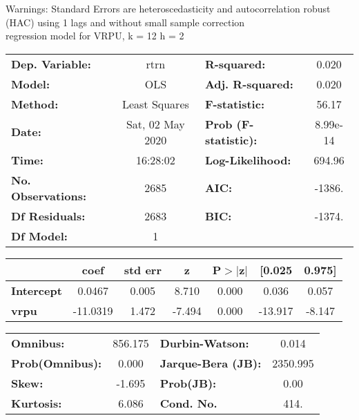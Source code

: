 Warnings: \newline
 [1] Standard Errors are heteroscedasticity and autocorrelation robust (HAC) using 1 lags and without small sample correction\\ 

regression model for VRPU, k = 12 h = 2\begin{center}
\begin{tabular}{lclc}
\toprule
\textbf{Dep. Variable:}    &       rtrn       & \textbf{  R-squared:         } &     0.020   \\
\textbf{Model:}            &       OLS        & \textbf{  Adj. R-squared:    } &     0.020   \\
\textbf{Method:}           &  Least Squares   & \textbf{  F-statistic:       } &     56.17   \\
\textbf{Date:}             & Sat, 02 May 2020 & \textbf{  Prob (F-statistic):} &  8.99e-14   \\
\textbf{Time:}             &     16:28:02     & \textbf{  Log-Likelihood:    } &    694.96   \\
\textbf{No. Observations:} &        2685      & \textbf{  AIC:               } &    -1386.   \\
\textbf{Df Residuals:}     &        2683      & \textbf{  BIC:               } &    -1374.   \\
\textbf{Df Model:}         &           1      & \textbf{                     } &             \\
\bottomrule
\end{tabular}
\begin{tabular}{lcccccc}
                   & \textbf{coef} & \textbf{std err} & \textbf{z} & \textbf{P$> |$z$|$} & \textbf{[0.025} & \textbf{0.975]}  \\
\midrule
\textbf{Intercept} &       0.0467  &        0.005     &     8.710  &         0.000        &        0.036    &        0.057     \\
\textbf{vrpu}      &     -11.0319  &        1.472     &    -7.494  &         0.000        &      -13.917    &       -8.147     \\
\bottomrule
\end{tabular}
\begin{tabular}{lclc}
\textbf{Omnibus:}       & 856.175 & \textbf{  Durbin-Watson:     } &    0.014  \\
\textbf{Prob(Omnibus):} &   0.000 & \textbf{  Jarque-Bera (JB):  } & 2350.995  \\
\textbf{Skew:}          &  -1.695 & \textbf{  Prob(JB):          } &     0.00  \\
\textbf{Kurtosis:}      &   6.086 & \textbf{  Cond. No.          } &     414.  \\
\bottomrule
\end{tabular}
\end{center}

